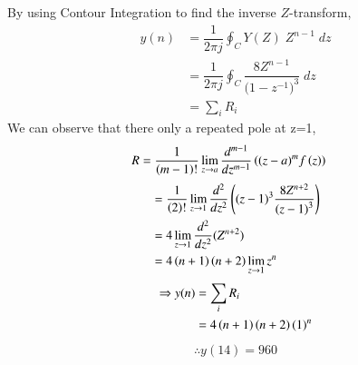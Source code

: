 \documentclass[journal,12pt,twocolumn]{IEEEtran}
\theoremstyle{remark}
\begin{document}
 By using Contour Integration to find the inverse $Z$-transform,
\begin{align}
    y(n)&=\dfrac{1}{2\pi j}\oint_{C}Y(Z) \;Z^{n-1} \;dz \\
    &=\dfrac{1}{2\pi j}\oint_{C}\dfrac{8Z^{n-1}}{({1-z^{-1})}^{3}} \;dz \\
    &=\sum\limits_{i}R_i
\end{align}
We can observe that there only a repeated pole at z=1,
\begin{align}
    R&=\dfrac{1}{\left(m-1\right)!}\lim\limits_{z\to a}\dfrac{d^{m-1}}{dz^{m-1}}\left({(z-a)}^{m}f\left(z\right)\right)   
\end{align}
\begin{align}
    &=\dfrac{1}{\left(2\right)!}\lim\limits_{z\to 1}\dfrac{d^{2}}{dz^{2}}\left({(z-1)}^{3}\dfrac{8Z^{n+2}}{{(z-1)}^3}\right)   \\
    &=4\lim\limits_{z\to 1}\dfrac{d^2}{dz^2}(Z^{n+2})   \\
    &=4\left(n+1\right)\left(n+2\right) \lim\limits_{z\to 1}z^{n}
\end{align}
\begin{align}
     \Rightarrow y(n) &=\sum\limits_{i}R_i    \\
    &=4\left(n+1\right)\left(n+2\right) (1)^n
\end{align}
\begin{align}
    \therefore y(14)=960
\end{align}

\end{document}

